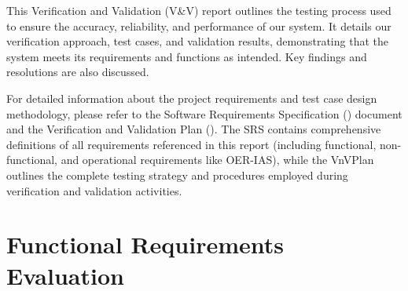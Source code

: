 \documentclass[12pt, titlepage]{article}
\begin{document}
\noindent This Verification and Validation (V\&V) report outlines the testing
process used to ensure the accuracy, reliability, and performance of
our system. It details our verification approach, test cases, and
validation results, demonstrating that the system meets its
requirements and functions as intended. Key findings and resolutions
are also discussed.

\noindent For detailed information about the project requirements and test case design methodology, please refer to the Software Requirements Specification (\SRS) document and the Verification and Validation Plan (\VnVPlan). The SRS contains comprehensive definitions of all requirements referenced in this report (including functional, non-functional, and operational requirements like OER-IAS), while the VnVPlan outlines the complete testing strategy and procedures employed during verification and validation activities.

\section{Functional Requirements Evaluation}
\end{document}
